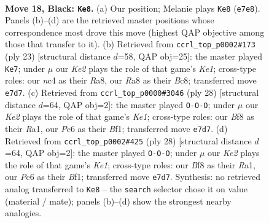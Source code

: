 \documentclass[11pt]{article}
\begin{document}
\clearpage

\begin{figure}[p]\centering
\begin{subfigure}{0.46\textwidth}\centering
\resizebox{\linewidth}{!}{%
\newchessgame
\chessboard[
  setfen={r1b2bnr/p3k1pp/2pB4/5p2/2N5/3B1P2/PPP3PP/R2R2K1 b - - 0 18},
  showmover=false,
  pgfstyle=straightmove, color=movearrow, markmove={e7-e8}
]}
\caption{}
\end{subfigure}\hfill
\begin{subfigure}{0.46\textwidth}\centering
\resizebox{\linewidth}{!}{%
\newchessgame
\chessboard[
  setfen={r1b1k2r/pp3ppp/1n2p3/1Bb5/P7/2P2N2/1P2KPPP/R1B4R b kq - 2 12},
  showmover=false,
  pgfstyle=straightmove, color=movearrow, markmove={e8-e7}
]}
\caption{}
\end{subfigure}
\\[4pt]
\begin{subfigure}{0.46\textwidth}\centering
\resizebox{\linewidth}{!}{%
\newchessgame
\chessboard[
  setfen={r2r2k1/ppp2p1p/6p1/4n3/2P5/P1NbP3/1P3PPP/R3KB1R w KQ - 3 15},
  showmover=false,
  pgfstyle=straightmove, color=movearrow, markmove={e1-c1}
]}
\caption{}
\end{subfigure}\hfill
\begin{subfigure}{0.46\textwidth}\centering
\resizebox{\linewidth}{!}{%
\newchessgame
\chessboard[
  setfen={r2r2k1/ppp2p1p/6p1/4n3/2P5/P1NbP3/1P3PPP/R3KB1R w KQ - 3 15},
  showmover=false,
  pgfstyle=straightmove, color=movearrow, markmove={e1-c1}
]}
\caption{}
\end{subfigure}
\caption{\textbf{Move 18, Black: \texttt{Ke8}.} (a) Our position; Melanie plays \texttt{Ke8} (\texttt{e7e8}). Panels (b)--(d) are the retrieved master positions whose correspondence most drove this move (highest QAP objective among those that transfer to it). (b) Retrieved from \texttt{ccrl\_top\_p0002\#173} (ply 23) [structural distance $d$=58, QAP obj=25]: the master played \texttt{Ke7}; under $\mu$ our \emph{Ke2} plays the role of that game's \emph{Ke1}; cross-type roles: our \emph{n}c4 as their \emph{R}a8, our \emph{R}a8 as their \emph{B}c8; transferred move \texttt{e7d7}. (c) Retrieved from \texttt{ccrl\_top\_p0000\#3046} (ply 28) [structural distance $d$=64, QAP obj=2]: the master played \texttt{O-O-O}; under $\mu$ our \emph{Ke2} plays the role of that game's \emph{Ke1}; cross-type roles: our \emph{B}f8 as their \emph{R}a1, our \emph{P}c6 as their \emph{B}f1; transferred move \texttt{e7d7}. (d) Retrieved from \texttt{ccrl\_top\_p0002\#425} (ply 28) [structural distance $d$=64, QAP obj=2]: the master played \texttt{O-O-O}; under $\mu$ our \emph{Ke2} plays the role of that game's \emph{Ke1}; cross-type roles: our \emph{B}f8 as their \emph{R}a1, our \emph{P}c6 as their \emph{B}f1; transferred move \texttt{e7d7}. Synthesis: no retrieved analog transferred to \texttt{Ke8} -- the \texttt{search} selector chose it on value (material / mate); panels (b)--(d) show the strongest nearby analogies.}
\label{fig:thought-m35}
\end{figure}
\end{document}
